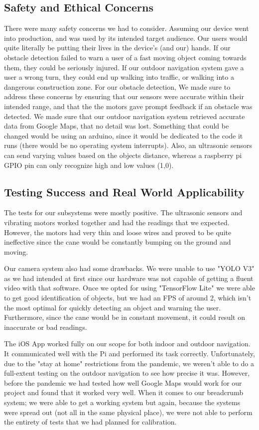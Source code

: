 \documentclass[letterpaper,12pt]{article}
\begin{document}
\subsection{Safety and Ethical Concerns}
There were many safety concerns we had to consider. Assuming our device went into production, and was used by its intended target audience. Our users would quite literally be putting their lives in the device's (and our) hands. If our obstacle detection failed to warn a user of a fast moving object coming towards them, they could be seriously injured. If our outdoor navigation system gave a user a wrong turn, they could end up walking into traffic, or walking into a dangerous construction zone. For our obstacle detection, We made sure to address these concerns by ensuring that our sensors were accurate within their intended range, and that the the motors gave prompt feedback if an obstacle was detected. We made sure that our outdoor navigation system retrieved accurate data from Google Maps, that no detail was lost. Something that could be changed would be using an arduino, since it would be dedicated to the code it runs (there would be no operating system interrupts). Also, an ultrasonic sensors can send varying values based on the objects distance, whereas a raspberry pi GPIO pin can only recognize high and low values (1,0).


\subsection{Testing Success and Real World Applicability}
The tests for our subsystems were mostly positive. The ultrasonic sensors and vibrating motors worked together and had the readings that we expected. However, the motors had very thin and loose wires and proved to be quite ineffective since the cane would be constantly bumping on the ground and moving. \par 
Our camera system also had some drawbacks. We were unable to use "YOLO V3" as we had intended at first since our hardware was not capable of getting a fluent video with that software. Once we opted for using "TensorFlow Lite" we were able to get good identification of objects, but we had an FPS of around 2, which isn't the most optimal for quickly detecting an object and warning the user. Furthermore, since the cane would be in constant movement, it could result on inaccurate or bad readings. \par
The iOS App worked fully on our scope for both indoor and outdoor navigation. It communicated well with the Pi and performed its task correctly. Unfortunately, due to the "stay at home" restrictions from the pandemic, we weren't able to do a full-extent testing on the outdoor navigation to see how precise it was. However, before the pandemic we had tested how well Google Maps would work for our project and found that it worked very well. When it comes to our breadcrumb system; we were able to get a working system but again, because the systems were spread out (not all in the same physical place), we were not able to perform the entirety of tests that we had planned for calibration.
\end{document}
